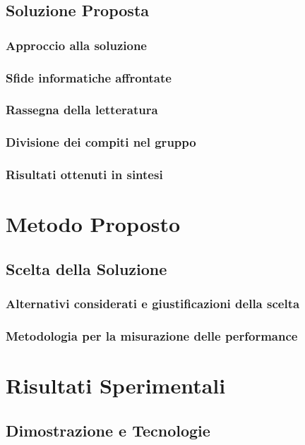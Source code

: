\documentclass[12pt,a4paper,twoside]{article}
\begin{document}
\subsection*{Soluzione Proposta}
\subsubsection*{Approccio alla soluzione}
\subsubsection*{Sfide informatiche affrontate}
\subsubsection*{Rassegna della letteratura}
\subsubsection*{Divisione dei compiti nel gruppo}
\subsubsection*{Risultati ottenuti in sintesi}


\newpage
\section{Metodo Proposto}

\subsection*{Scelta della Soluzione}
\subsubsection*{Alternativi considerati e giustificazioni della scelta}
\subsubsection*{Metodologia per la misurazione delle performance}


\newpage
\section{Risultati Sperimentali}

\subsection*{Dimostrazione e Tecnologie}
\end{document}
